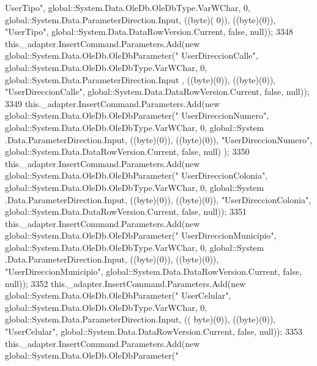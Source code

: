 \begin{DoxyCode}
{      UserTipo"}, global::System.Data.OleDb.OleDbType.VarWChar, 0, global::System.Data.ParameterDirection.Input, ((byte)(
      0)), ((byte)(0)), \textcolor{stringliteral}{"UserTipo"}, global::System.Data.DataRowVersion.Current, \textcolor{keyword}{false}, null));
3348             this.\_adapter.InsertCommand.Parameters.Add(\textcolor{keyword}{new} global::System.Data.OleDb.OleDbParameter(\textcolor{stringliteral}{"
      UserDireccionCalle"}, global::System.Data.OleDb.OleDbType.VarWChar, 0, global::System.Data.ParameterDirection.Input
      , ((byte)(0)), ((byte)(0)), \textcolor{stringliteral}{"UserDireccionCalle"}, global::System.Data.DataRowVersion.Current, \textcolor{keyword}{false}, null));
3349             this.\_adapter.InsertCommand.Parameters.Add(\textcolor{keyword}{new} global::System.Data.OleDb.OleDbParameter(\textcolor{stringliteral}{"
      UserDireccionNumero"}, global::System.Data.OleDb.OleDbType.VarWChar, 0, global::System
      .Data.ParameterDirection.Input, ((byte)(0)), ((byte)(0)), \textcolor{stringliteral}{"UserDireccionNumero"}, global::System.Data.DataRowVersion.Current, \textcolor{keyword}{false}, null)
      );
3350             this.\_adapter.InsertCommand.Parameters.Add(\textcolor{keyword}{new} global::System.Data.OleDb.OleDbParameter(\textcolor{stringliteral}{"
      UserDireccionColonia"}, global::System.Data.OleDb.OleDbType.VarWChar, 0, global::System
      .Data.ParameterDirection.Input, ((byte)(0)), ((byte)(0)), \textcolor{stringliteral}{"UserDireccionColonia"}, global::System.Data.DataRowVersion.Current, \textcolor{keyword}{false}, 
      null));
3351             this.\_adapter.InsertCommand.Parameters.Add(\textcolor{keyword}{new} global::System.Data.OleDb.OleDbParameter(\textcolor{stringliteral}{"
      UserDireccionMunicipio"}, global::System.Data.OleDb.OleDbType.VarWChar, 0, global::System
      .Data.ParameterDirection.Input, ((byte)(0)), ((byte)(0)), \textcolor{stringliteral}{"UserDireccionMunicipio"}, global::System.Data.DataRowVersion.Current, \textcolor{keyword}{false},
       null));
3352             this.\_adapter.InsertCommand.Parameters.Add(\textcolor{keyword}{new} global::System.Data.OleDb.OleDbParameter(\textcolor{stringliteral}{"
      UserCelular"}, global::System.Data.OleDb.OleDbType.VarWChar, 0, global::System.Data.ParameterDirection.Input, ((
      byte)(0)), ((byte)(0)), \textcolor{stringliteral}{"UserCelular"}, global::System.Data.DataRowVersion.Current, \textcolor{keyword}{false}, null));
3353             this.\_adapter.InsertCommand.Parameters.Add(\textcolor{keyword}{new} global::System.Data.OleDb.OleDbParameter(\textcolor{stringliteral}{"
}
\end{DoxyCode}
